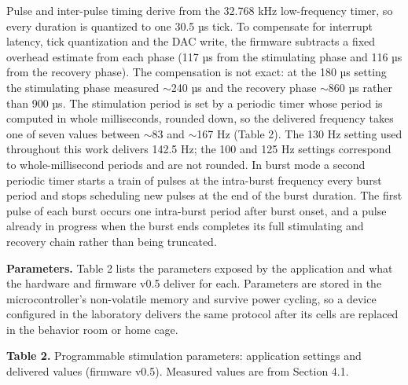 Pulse and inter-pulse timing derive from the 32.768 kHz low-frequency timer, so every duration is quantized to one 30.5 µs tick. To compensate for interrupt latency, tick quantization and the DAC write, the firmware subtracts a fixed overhead estimate from each phase (117 µs from the stimulating phase and 116 µs from the recovery phase). The compensation is not exact: at the 180 µs setting the stimulating phase measured $\sim$240 µs and the recovery phase $\sim$860 µs rather than 900 µs. The stimulation period is set by a periodic timer whose period is computed in whole milliseconds, rounded down, so the delivered frequency takes one of seven values between $\sim$83 and $\sim$167 Hz (Table 2). The 130 Hz setting used throughout this work delivers 142.5 Hz; the 100 and 125 Hz settings correspond to whole-millisecond periods and are not rounded. In burst mode a second periodic timer starts a train of pulses at the intra-burst frequency every burst period and stops scheduling new pulses at the end of the burst duration. The first pulse of each burst occurs one intra-burst period after burst onset, and a pulse already in progress when the burst ends completes its full stimulating and recovery chain rather than being truncated.

\textbf{Parameters.} Table 2 lists the parameters exposed by the application and what the hardware and firmware v0.5 deliver for each. Parameters are stored in the microcontroller's non-volatile memory and survive power cycling, so a device configured in the laboratory delivers the same protocol after its cells are replaced in the behavior room or home cage.

\textbf{Table 2.} Programmable stimulation parameters: application settings and delivered values (firmware v0.5). Measured values are from Section 4.1.

